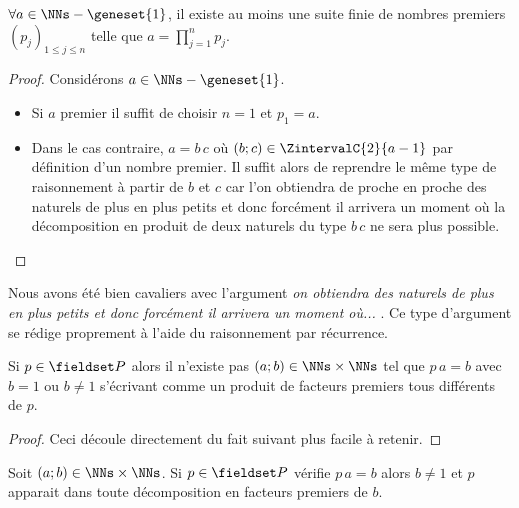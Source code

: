 \begin{fact} \label{exists-decompo}
	$\forall a \in \NNs - \geneset{1}$, il existe au moins une suite finie de nombres premiers $(p_j)_{1 \leq j \leq n}$
	telle que $\displaystyle a = \prod_{j=1}^{n} p_j$. 
\end{fact}

\begin{proof}
	Considérons $a \in \NNs - \geneset{1}$.
	
	\begin{itemize}[label=\small\textbullet]
		\item Si $a$ premier il suffit de choisir $n = 1$ et $p_1 = a$.
	
	
		\item Dans le cas contraire, $a = b \, c$ où $(b ; c) \in \ZintervalC{2}{a-1}$ par définition d'un nombre premier.
		Il suffit alors de reprendre le même type de raisonnement à partir de $b$ et $c$ car l'on obtiendra de proche en proche des naturels de plus en plus petits et donc forcément il arrivera un moment où la décomposition en produit de deux naturels du type $b \, c$ ne sera plus possible.
	\end{itemize}
\end{proof}


\begin{unproved}
	Nous avons été bien cavaliers avec l'argument \emph{\og on obtiendra des naturels de plus en plus petits et donc forcément il arrivera un moment où... \fg}. Ce type d'argument se rédige proprement à l'aide du raisonnement par récurrence.

\end{unproved}



\begin{fact} \label{pseudo-prime-divisor}
	Si $p \in \PP$ alors il n'existe pas $(a ; b) \in \NNs \times \NNs$ tel que
	$p \, a = b$ avec $b = 1$ ou $b \neq 1$ s'écrivant comme un produit de facteurs premiers tous différents de $p$.
\end{fact}
	

\begin{proof}
	Ceci découle directement du fait suivant plus facile à retenir.
\end{proof}









\begin{fact} \label{prime-divisor}
	Soit
	$(a ; b) \in \NNs \times \NNs$.
	Si $p \in \PP$ vérifie $p \, a = b$ alors $b \neq 1$ et $p$ apparait dans toute décomposition en facteurs premiers de $b$.
\end{fact}
	

